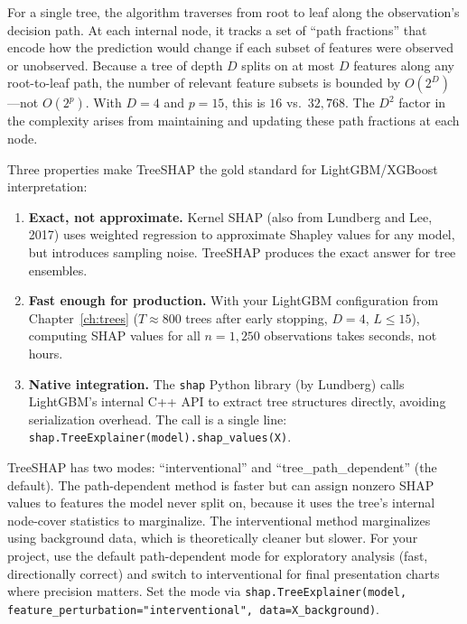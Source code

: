 For a single tree, the algorithm traverses from root to leaf along the observation's decision path.
At each internal node, it tracks a set of ``path fractions'' that encode how the prediction would change if each subset of features were observed or unobserved.
Because a tree of depth $D$ splits on at most $D$ features along any root-to-leaf path, the number of relevant feature subsets is bounded by $O(2^D)$---not $O(2^p)$.
With $D = 4$ and $p = 15$, this is $16$ vs.\ $32{,}768$.
The $D^2$ factor in the complexity arises from maintaining and updating these path fractions at each node.

Three properties make TreeSHAP the gold standard for LightGBM/XGBoost interpretation:
\begin{enumerate}[nosep]
  \item \textbf{Exact, not approximate.}
  Kernel SHAP (also from Lundberg and Lee, 2017) uses weighted regression to approximate Shapley values for any model, but introduces sampling noise.
  TreeSHAP produces the exact answer for tree ensembles.

  \item \textbf{Fast enough for production.}
  With your LightGBM configuration from Chapter~\ref{ch:trees} ($T \approx 800$ trees after early stopping, $D = 4$, $L \leq 15$), computing SHAP values for all $n = 1{,}250$ observations takes seconds, not hours.

  \item \textbf{Native integration.}
  The \texttt{shap} Python library (by Lundberg) calls LightGBM's internal C++ API to extract tree structures directly, avoiding serialization overhead.
  The call is a single line: \texttt{shap.TreeExplainer(model).shap\_values(X)}.
\end{enumerate}

\begin{warning}
TreeSHAP has two modes: ``interventional'' and ``tree\_path\_dependent'' (the default).
The path-dependent method is faster but can assign nonzero SHAP values to features the model never split on, because it uses the tree's internal node-cover statistics to marginalize.
The interventional method marginalizes using background data, which is theoretically cleaner but slower.
For your project, use the default path-dependent mode for exploratory analysis (fast, directionally correct) and switch to interventional for final presentation charts where precision matters.
Set the mode via \texttt{shap.TreeExplainer(model, feature\_perturbation="interventional", data=X\_background)}.
\end{warning}

